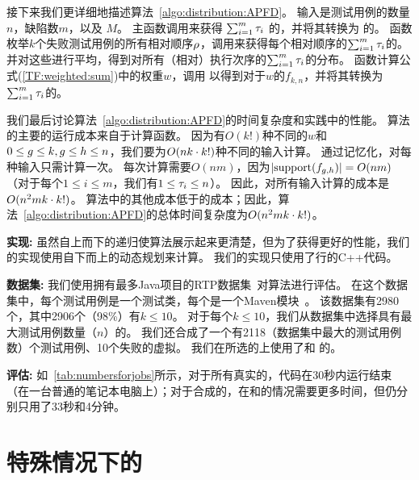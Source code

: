 接下来我们更详细地描述算法~\ref{algo:distribution:APFD}。
输入是测试用例的数量$n$，缺陷数$m$，以及 \mappingMatrix{}$M$。
主函数调用来获得 $\sum_{i=1}^m\tau_i$ 的\distribution{}，并将其转换为\APFD{} 的\distribution{}。
函数枚举$k$个失败测试用例的所有相对顺序$\rho$，调用来获得每个相对顺序的$\sum_{i=1}^m\tau_i$的\distribution{}。并对这些\distributions{}进行平均，得到对所有（相对）执行次序的$\sum_{i=1}^m\tau_i$的分布。
函数计算公式(\ref{TF:weighted:sum})中的权重$w$，调用 以得到对于$w$的$f_{k,n}$，并将其转换为$\sum_{i=1}^m\tau_i$的\distribution{}。

我们最后讨论算法~\ref{algo:distribution:APFD}的时间复杂度和实践中的性能。
算法的主要的运行成本来自于计算函数。
因为有$O(k!)$种不同的$w$和$0\le g\le k,g\le h\le n$，我们要为$O(nk\cdot k!)$种不同的输入计算。
通过记忆化，对每种输入只需计算一次。
每次计算需要$O(nm)$，因为$|\mathrm{support}(f_{g,h})|=O(nm)$（对于每个$1\le i\le m$，我们有$1\le \tau_i\le n$）。
 因此，对所有输入计算的成本是$O(n^2mk\cdot k!)$。
算法中的其他成本低于的成本；因此，算法~\ref{algo:distribution:APFD}的总体时间复杂度为$O(n^2mk\cdot k!)$。

\newcommand{\mysubsubsection}[1]{\noindent\textbf{#1:}}
\mysubsubsection{实现}
虽然自上而下的递归使算法展示起来更清楚，但为了获得更好的性能，我们的实现使用自下而上的动态规划来计算。
我们的实现只使用了\CPPLine{}行的C++代码。

\mysubsubsection{数据集}
我们使用拥有最多Java项目的RTP数据集~\cite{Peng2020IRTCP}对算法进行评估。
在这个数据集中，每个测试用例是一个测试类，每个\class{}是一个Maven模块~\cite{2020Maven}。
该数据集有2980个\job{}，其中2906个（98\%）有$k\le 10$。
对于每个$k\le 10$，我们从数据集中选择具有最大测试用例数量（$n$）的\job{}。
我们还合成了一个有2118（数据集中最大的测试用例数）个测试用例、10个失败的虚拟\job{}。
我们在所选的\job{}上使用了\mappingAllToOne{}和 \mappingOneToOne{}的\mappingMatrices{}。



\mysubsubsection{评估}
如\Table~\ref{tab:numbersforjobs}所示，对于所有真实的\job{}，代码在30秒内运行结束（在一台普通的笔记本电脑上）；对于合成的\job{}，在\mappingAllToOne{}和\mappingOneToOne{}的情况需要更多时间，但仍分别只用了33秒和4分钟。

\section{特殊情况下\APFD{}的\Distributions{}}

